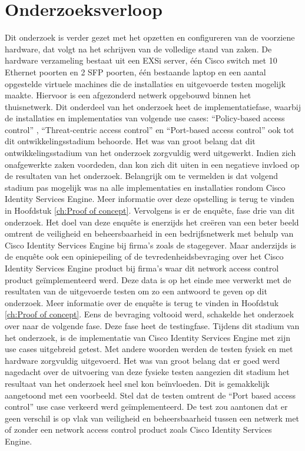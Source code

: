 \section{Onderzoeksverloop}
Dit onderzoek is verder gezet met het opzetten en configureren van de voorziene hardware, dat volgt na het schrijven van de volledige stand van zaken. De hardware verzameling bestaat uit een EXSi server, één Cisco switch met 10 Ethernet poorten en 2 SFP poorten, één bestaande laptop en een aantal opgestelde virtuele machines die de installaties en uitgevoerde testen mogelijk maakte. Hiervoor is een afgezonderd netwerk opgebouwd binnen het thuisnetwerk. 
Dit onderdeel van het onderzoek heet de implementatiefase, waarbij de installaties en implementaties van volgende use cases: “Policy-based access control” , “Threat-centric access control” en “Port-based access control” ook tot dit ontwikkelingsstadium behoorde. 
\newline
\newline
Het was van groot belang dat dit ontwikkelingsstadium van het onderzoek zorgvuldig werd uitgewerkt. Indien zich onafgewerkte zaken voordeden, dan kon zich dit uiten in een negatieve invloed op de resultaten van het onderzoek. 
Belangrijk om te vermelden is dat volgend stadium pas mogelijk was na alle implementaties en installaties rondom Cisco Identity Services Engine. Meer informatie over deze opstelling is terug te vinden in Hoofdstuk \ref{ch:Proof of concept}.
\newline
\newline
Vervolgens is er de enquête, fase drie van dit onderzoek. Het doel van deze enquête is enerzijds het creëren van een beter beeld omtrent de veiligheid en beheersbaarheid in een bedrijfsnetwerk met behulp van Cisco Identity Services Engine bij firma’s zoals de stagegever. Maar anderzijds is de enquête ook een opiniepeiling of de tevredenheidsbevraging over het Cisco Identity Services Engine product bij firma’s waar dit network access control product geïmplementeerd werd. Deze data is op het einde mee verwerkt met de resultaten van de uitgevoerde testen om zo een antwoord te geven op dit onderzoek. Meer informatie over de enquête is terug te vinden in Hoofdstuk \ref{ch:Proof of concept}.
\newline
\newline
Eens de bevraging voltooid werd, schakelde het onderzoek over naar de volgende fase. Deze fase heet de testingfase. Tijdens dit stadium van het onderzoek, is de implementatie van Cisco Identity Services Engine met zijn use cases uitgebreid getest. Met andere woorden werden de testen fysiek en met hardware zorgvuldig uitgevoerd. Het was van groot belang dat er goed werd nagedacht over de uitvoering van deze fysieke testen aangezien dit stadium het resultaat van het onderzoek heel snel kon beïnvloeden. Dit is gemakkelijk aangetoond met een voorbeeld. Stel dat de testen omtrent de “Port based access control” use case verkeerd werd geïmplementeerd. De test zou aantonen dat er geen verschil is op vlak van veiligheid en beheersbaarheid tussen een netwerk met of zonder een network access control product zoals Cisco Identity Services Engine. 

